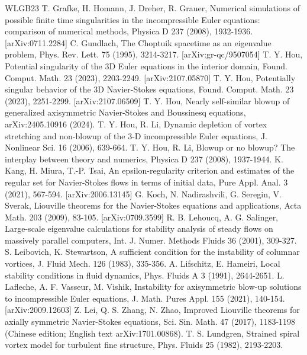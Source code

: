 \documentclass[11pt]{article}
\begin{document}
\begin{thebibliography}{WLGB23}
 T. Grafke, H. Homann, J. Dreher, R. Grauer, Numerical simulations of possible finite time singularities in the incompressible Euler equations: comparison of numerical methods, Physica D 237 (2008), 1932-1936. [arXiv:0711.2284]
 C. Gundlach, The Choptuik spacetime as an eigenvalue problem, Phys. Rev. Lett. 75 (1995), 3214-3217. [arXiv:gr-qc/9507054]
 T. Y. Hou, Potential singularity of the 3D Euler equations in the interior domain, Found. Comput. Math. 23 (2023), 2203-2249. [arXiv:2107.05870]
 T. Y. Hou, Potentially singular behavior of the 3D Navier-Stokes equations, Found. Comput. Math. 23 (2023), 2251-2299. [arXiv:2107.06509]
 T. Y. Hou, Nearly self-similar blowup of generalized axisymmetric Navier-Stokes and Boussinesq equations, arXiv:2405.10916 (2024).
 T. Y. Hou, R. Li, Dynamic depletion of vortex stretching and non-blowup of the 3-D incompressible Euler equations, J. Nonlinear Sci. 16 (2006), 639-664.
 T. Y. Hou, R. Li, Blowup or no blowup? The interplay between theory and numerics, Physica D 237 (2008), 1937-1944.
 K. Kang, H. Miura, T.-P. Tsai, An epsilon-regularity criterion and estimates of the regular set for Navier-Stokes flows in terms of initial data, Pure Appl. Anal. 3 (2021), 567-594. [arXiv:2006.13145]
 G. Koch, N. Nadirashvili, G. Seregin, V. Sverak, Liouville theorems for the Navier-Stokes equations and applications, Acta Math. 203 (2009), 83-105. [arXiv:0709.3599]
 R. B. Lehoucq, A. G. Salinger, Large-scale eigenvalue calculations for stability analysis of steady flows on massively parallel computers, Int. J. Numer. Methods Fluids 36 (2001), 309-327.
 S. Leibovich, K. Stewartson, A sufficient condition for the instability of columnar vortices, J. Fluid Mech. 126 (1983), 335-356.
 A. Lifschitz, E. Hameiri, Local stability conditions in fluid dynamics, Phys. Fluids A 3 (1991), 2644-2651.
 L. Lafleche, A. F. Vasseur, M. Vishik, Instability for axisymmetric blow-up solutions to incompressible Euler equations, J. Math. Pures Appl. 155 (2021), 140-154. [arXiv:2009.12603]
 Z. Lei, Q. S. Zhang, N. Zhao, Improved Liouville theorems for axially symmetric Navier-Stokes equations, Sci. Sin. Math. 47 (2017), 1183-1198 (Chinese edition; English text arXiv:1701.00868).
 T. S. Lundgren, Strained spiral vortex model for turbulent fine structure, Phys. Fluids 25 (1982), 2193-2203.

\end{thebibliography}
\end{document}
